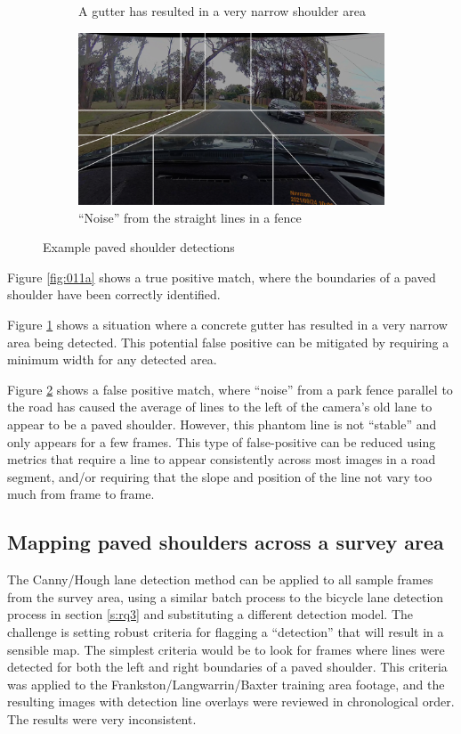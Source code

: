 \documentclass[11pt,twoside]{report}
\begin{document}
\begin{figure}[h]
\begin{subfigure}{0.3\textwidth}
	\caption{A gutter has resulted in a very narrow shoulder area}
	\label{fig:011b}
\end{subfigure}
\hfill
\begin{subfigure}{0.3\textwidth}
	\includegraphics[width=\textwidth]{f011_false_fence.png}
	\caption{``Noise'' from the straight lines in a fence}
	\label{fig:011c}
\end{subfigure}
\caption{Example paved shoulder detections}
\label{fig:011}
\end{figure}

Figure \ref{fig:011a} shows a true positive match, where the boundaries of a paved shoulder have been correctly identified.

Figure \ref{fig:011b} shows a situation where a concrete gutter has resulted in a very narrow area being detected.  This potential false positive can be mitigated by requiring a minimum width for any detected area.

Figure \ref{fig:011c} shows a false positive match, where ``noise'' from a park fence parallel to the road has caused the average of lines to the left of the camera's old lane to appear to be a paved shoulder.  However, this phantom line is not ``stable'' and only appears for a few frames.  This type of false-positive can be reduced using metrics that require a line to appear consistently across most images in a road segment, and/or requiring that the slope and position of the line not vary too much from frame to frame.


\subsection{Mapping paved shoulders across a survey area}

The Canny/Hough lane detection method can be applied to all sample frames from the survey area, using a similar batch process to the bicycle lane detection process in section \ref{s:rq3} and substituting a different detection model.  The challenge is setting robust criteria for flagging a ``detection'' that will result in a sensible map.  The simplest criteria would be to look for frames where lines were detected for both the left and right boundaries of a paved shoulder.  This criteria was applied to the Frankston/Langwarrin/Baxter training area footage, and the resulting images with detection line overlays were reviewed in chronological order.  The results were very inconsistent.
\end{document}

